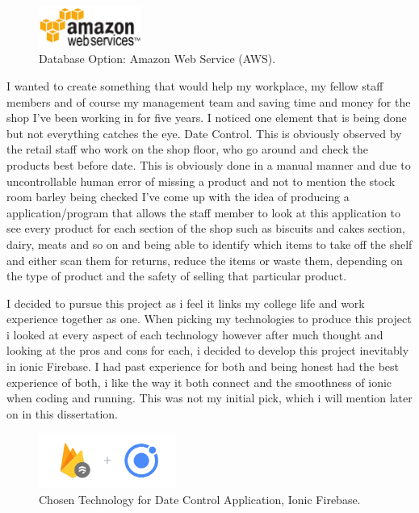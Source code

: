 \begin{figure}[h!]
	\caption{Database Option: Amazon Web Service (AWS).}
	\label{image:aws}
	\centering
	\includegraphics[width=0.3\textwidth]{images/aws.png}
\end{figure}


I wanted to create something that would help my workplace, my fellow staff members and of course my management team and saving time and money for the shop I've been working in for five years. I noticed one element that is being done but not everything catches the eye. Date Control. This is obviously observed by the retail staff who work on the shop floor, who go around and check the products best before date.  This is obviously done in a manual manner and due to uncontrollable human error of missing a product and not to mention the stock room barley being checked I've come up with the idea of producing a application/program that allows the staff member to look at this application to see every product for each section of the shop such as biscuits and cakes section, dairy, meats and so on and being able to identify which items to take off the shelf and either scan them for returns, reduce the items or waste them, depending on the type of product and the safety of selling that particular product.   
\newline

I decided to pursue this project as i feel it links my college life and work experience together as one. When picking my technologies to produce this project i looked at every aspect of each technology however after much thought and looking at the pros and cons for each, i decided to develop this project inevitably in ionic Firebase. I had past experience for both and being honest had the best experience of both, i like the way it both connect and the smoothness of ionic when coding and running. This was not my initial pick, which i will mention later on in this dissertation.

\begin{figure}[h!]
	\caption{Chosen Technology for Date Control Application, Ionic Firebase.}
	\label{image:ionicfirebase}
	\centering
	\includegraphics[width=0.4\textwidth]{images/ionicfirebase.png}
\end{figure}

